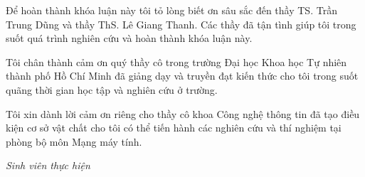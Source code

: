 Để hoàn thành khóa luận này tôi tỏ lòng biết ơn sâu sắc đến thầy TS. Trần Trung Dũng và thầy
ThS. Lê Giang Thanh. Các thầy đã tận tình giúp tôi trong suốt
quá trình nghiên cứu và hoàn thành khóa luận này.

Tôi chân thành cảm ơn quý thầy cô trong trường Đại học Khoa học Tự nhiên thành phố Hồ Chí
Minh đã giảng dạy và truyền đạt kiến thức cho tôi trong suốt quãng thời gian học tập và
nghiên cứu ở trường.

Tôi xin dành lời cảm ơn riêng cho thầy cô khoa Công nghệ thông tin đã tạo
điều kiện cơ sở vật chất cho tôi có thể tiến hành các nghiên cứu và thí nghiệm tại phòng
bộ môn Mạng máy tính.

\begin{flushright}
\textit{Sinh viên thực hiện}
\end{flushright}